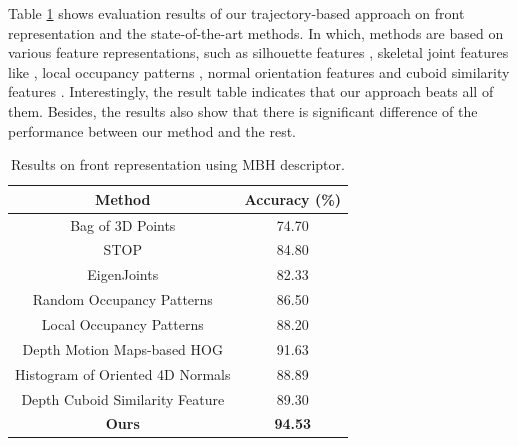 \documentclass[review]{elsarticle}
\begin{document}
Table \ref{lbl:Table_MBHvsSoAonFront} shows evaluation results of our trajectory-based approach on front representation and the state-of-the-art methods. In which, methods are based on various feature representations, such as silhouette features \cite{li2010action, yang2012recognizing}, skeletal joint features like \cite{yang2012eigenjoints, wang2012mining}, local occupancy patterns \cite{wang2012robust, vieira2012stop}, normal orientation features \cite{oreifej2013hon4d} and cuboid similarity features \cite{xia2013spatio}. Interestingly, the result table indicates that our approach beats all of them. Besides, the results also show that there is significant difference of the performance between our method and the rest.

\begin{table}
	\begin{center}
		\begin{tabular}{c|c}
		
		  {\bf Method} & {\bf Accuracy (\%)} \\
		\hline
		Bag of 3D Points \cite{li2010action} &         74.70  \\
		
		      STOP \cite{vieira2012stop} &         84.80  \\
		
		EigenJoints \cite{yang2012eigenjoints} &         82.33  \\
		
		Random Occupancy Patterns \cite{wang2012robust} &         86.50  \\
		
		Local Occupancy Patterns \cite{wang2012mining} &         88.20  \\
		
		Depth Motion Maps-based HOG \cite{yang2012recognizing} &         91.63  \\
		
		Histogram of Oriented 4D Normals \cite{oreifej2013hon4d} &         88.89  \\
		
		Depth Cuboid Similarity Feature \cite{xia2013spatio} &         89.30  \\
		\hline
		    {\bf Ours} &   {\bf 94.53 } \\
		
		\end{tabular}  
	\end{center}
	\caption{\label{lbl:Table_MBHvsSoAonFront}Results on front representation using MBH descriptor.}
\end{table}
\end{document}

